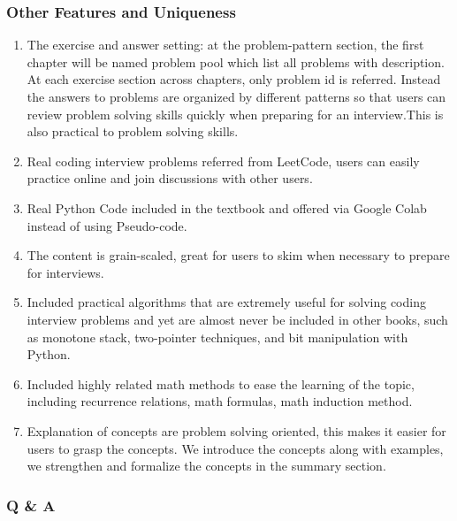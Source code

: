 \documentclass[../main.tex]{subfiles}
\begin{document}
\subsubsection{Other Features and Uniqueness}
\begin{enumerate}
    \item The exercise and answer setting: at the problem-pattern section, the first chapter will be named problem pool which list all problems with description. At each exercise section across chapters, only problem id is referred. Instead the answers to problems are organized by different patterns so that users can review problem solving skills quickly when preparing for an interview.This is also practical to problem solving skills. 
\item Real coding interview problems referred from LeetCode,  users can easily practice online and join discussions with other users.
\item Real Python Code included in the textbook and offered via Google Colab instead of using Pseudo-code. 
\item The content is grain-scaled, great for users to skim when necessary to prepare for interviews. 
\item Included practical algorithms that are extremely useful for solving coding interview problems and yet are almost never be included in other books, such as monotone stack, two-pointer techniques, and bit manipulation with Python. 
\item Included highly related math methods to ease the learning of the topic, including recurrence relations, math formulas, math induction method. 
\item Explanation of concepts are problem solving oriented, this makes it easier for users to grasp the concepts. We introduce the concepts along with examples, we strengthen and formalize the concepts in the summary section.
\end{enumerate}

\subsubsection{Q \& A} 
\end{document}
